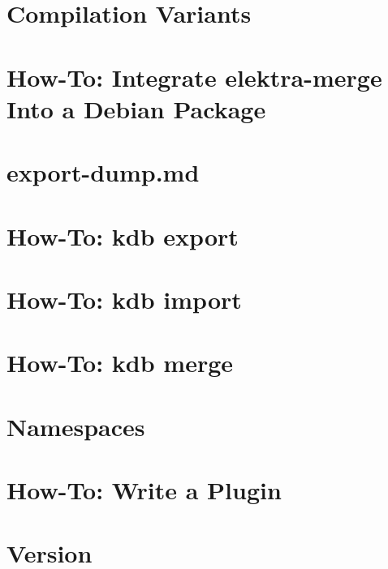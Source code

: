\documentclass[twoside]{book}
\newcommand{\+}{\discretionary{\mbox{\scriptsize$\hookleftarrow$}}{}{}}
\begin{document}
\chapter{Compilation Variants}
\label{doc_tutorials_compilation-variants_md}
\hypertarget{doc_tutorials_compilation-variants_md}{}

\chapter{How-\/\+To\+: Integrate elektra-\/merge Into a Debian Package}
\label{doc_tutorials_elektra-merge-integration_md}
\hypertarget{doc_tutorials_elektra-merge-integration_md}{}

\chapter{export-\/dump.md}
\label{doc_tutorials_export-dump_md}
\hypertarget{doc_tutorials_export-dump_md}{}

\chapter{How-\/\+To\+: kdb export}
\label{doc_tutorials_export_md}
\hypertarget{doc_tutorials_export_md}{}

\chapter{How-\/\+To\+: kdb import}
\label{doc_tutorials_import_md}
\hypertarget{doc_tutorials_import_md}{}

\chapter{How-\/\+To\+: kdb merge}
\label{doc_tutorials_merge_md}
\hypertarget{doc_tutorials_merge_md}{}

\chapter{Namespaces}
\label{doc_tutorials_namespaces_md}
\hypertarget{doc_tutorials_namespaces_md}{}

\chapter{How-\/\+To\+: Write a Plugin}
\label{doc_tutorials_plugins_md}
\hypertarget{doc_tutorials_plugins_md}{}

\chapter{Version}
\label{doc_VERSION_md}
\hypertarget{doc_VERSION_md}{}

\end{document}
